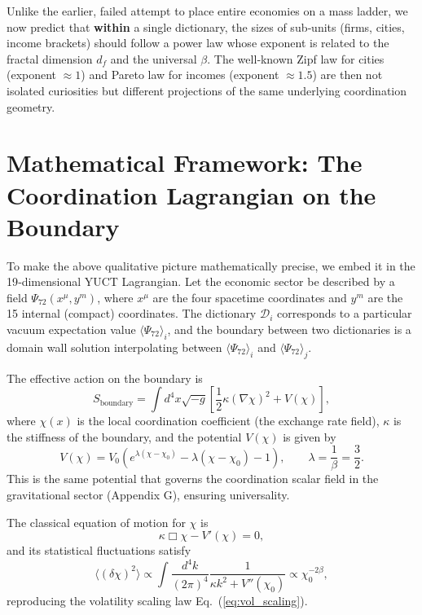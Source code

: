 \documentclass[12pt,a4paper]{article}
\theoremstyle{remark}
\begin{document}
	Unlike the earlier, failed attempt to place entire economies on a mass ladder, we now predict that \textbf{within} a single dictionary, the sizes of sub‑units (firms, cities, income brackets) should follow a power law whose exponent is related to the fractal dimension \(d_f\) and the universal \(\beta\). The well‑known Zipf law for cities (exponent \(\approx 1\)) and Pareto law for incomes (exponent \(\approx 1.5\)) are then not isolated curiosities but different projections of the same underlying coordination geometry.
	
	\section{Mathematical Framework: The Coordination Lagrangian on the Boundary}
	
	To make the above qualitative picture mathematically precise, we embed it in the 19‑dimensional YUCT Lagrangian. Let the economic sector be described by a field \(\Psi_{72}(x^\mu, y^m)\), where \(x^\mu\) are the four spacetime coordinates and \(y^m\) are the 15 internal (compact) coordinates. The dictionary \(\mathcal{D}_i\) corresponds to a particular vacuum expectation value \(\langle \Psi_{72} \rangle_i\), and the boundary between two dictionaries is a domain wall solution interpolating between \(\langle \Psi_{72} \rangle_i\) and \(\langle \Psi_{72} \rangle_j\).
	
	The effective action on the boundary is
	\begin{equation}
		S_{\mathrm{boundary}} = \int d^4x \sqrt{-g} \left[ \frac{1}{2} \kappa (\nabla \chi)^2 + V(\chi) \right],
		\label{eq:action}
	\end{equation}
	where \(\chi(x)\) is the local coordination coefficient (the exchange rate field), \(\kappa\) is the stiffness of the boundary, and the potential \(V(\chi)\) is given by
	\begin{equation}
		V(\chi) = V_0 \left( e^{\lambda(\chi - \chi_0)} - \lambda(\chi - \chi_0) - 1 \right), \qquad \lambda = \frac{1}{\beta} = \frac{3}{2}.
		\label{eq:potential}
	\end{equation}
	This is the same potential that governs the coordination scalar field in the gravitational sector (Appendix G), ensuring universality.
	
	The classical equation of motion for \(\chi\) is
	\begin{equation}
		\kappa \Box \chi - V'(\chi) = 0,
		\label{eq:eom}
	\end{equation}
	and its statistical fluctuations satisfy
	\begin{equation}
		\langle (\delta \chi)^2 \rangle \propto \int \frac{d^4k}{(2\pi)^4} \frac{1}{\kappa k^2 + V''(\chi_0)} \propto \chi_0^{-2\beta},
		\label{eq:fluctuations}
	\end{equation}
	reproducing the volatility scaling law Eq.~(\ref{eq:vol_scaling}).
	
\end{document}
